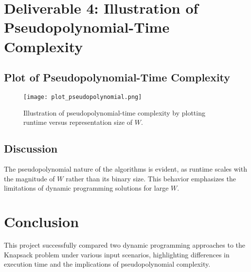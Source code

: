\documentclass{article}
\begin{document}
\section{Deliverable 4: Illustration of Pseudopolynomial-Time Complexity}
\subsection*{Plot of Pseudopolynomial-Time Complexity}
\begin{figure}[h!]
    \centering
    \texttt{[image: plot\_pseudopolynomial.png]}
    \caption{Illustration of pseudopolynomial-time complexity by plotting runtime versus representation size of \( W \).}
\end{figure}

\subsection*{Discussion}
The pseudopolynomial nature of the algorithms is evident, as runtime scales with the magnitude of \( W \) rather than its binary size. This behavior emphasizes the limitations of dynamic programming solutions for large \( W \).

\section*{Conclusion}
This project successfully compared two dynamic programming approaches to the Knapsack problem under various input scenarios, highlighting differences in execution time and the implications of pseudopolynomial complexity.
\end{document}
